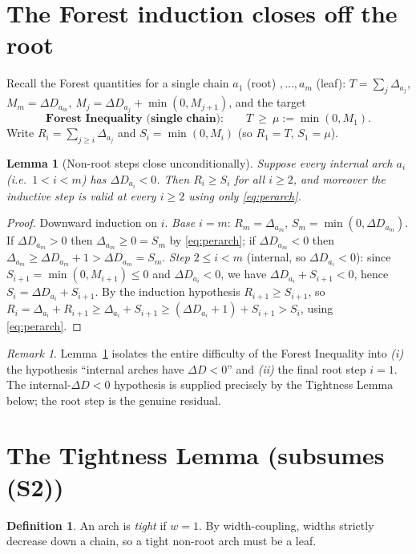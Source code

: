 \documentclass[11pt]{article}
\theoremstyle{plain}
\newtheorem{lemma}[theorem]{Lemma}
\theoremstyle{definition}
\newtheorem{definition}[theorem]{Definition}
\theoremstyle{remark}
\newtheorem{remark}[theorem]{Remark}
\newcommand{\dD}{\Delta D}
\begin{document}
\section{The Forest induction closes off the root}

Recall the Forest quantities for a single chain $a_1$ (root) $,\dots,a_m$ (leaf):
$T=\sum_j\Delta_{a_j}$, $M_m=\dD_{a_m}$, $M_j=\dD_{a_j}+\min(0,M_{j+1})$, and the target
\[
\textbf{Forest Inequality (single chain):}\qquad T\ \ge\ \mu:=\min(0,M_1).
\]
Write $R_i=\sum_{j\ge i}\Delta_{a_j}$ and $S_i=\min(0,M_i)$ (so $R_1=T$, $S_1=\mu$).

\begin{lemma}[Non-root steps close unconditionally]\label{lem:induct}
Suppose every \emph{internal} arch $a_i$ (i.e.\ $1<i<m$) has $\dD_{a_i}<0$. Then
$R_i\ge S_i$ for all $i\ge2$, and moreover the inductive step is valid at every $i\ge2$
using only \eqref{eq:perarch}.
\end{lemma}
\begin{proof}
Downward induction on $i$. \emph{Base} $i=m$: $R_m=\Delta_{a_m}$, $S_m=\min(0,\dD_{a_m})$.
If $\dD_{a_m}>0$ then $\Delta_{a_m}\ge0=S_m$ by \eqref{eq:perarch}; if $\dD_{a_m}<0$ then
$\Delta_{a_m}\ge\dD_{a_m}+1>\dD_{a_m}=S_m$. \emph{Step} $2\le i<m$ (internal, so
$\dD_{a_i}<0$): since $S_{i+1}=\min(0,M_{i+1})\le0$ and $\dD_{a_i}<0$, we have
$\dD_{a_i}+S_{i+1}<0$, hence $S_i=\dD_{a_i}+S_{i+1}$. By the induction hypothesis
$R_{i+1}\ge S_{i+1}$, so
$R_i=\Delta_{a_i}+R_{i+1}\ge\Delta_{a_i}+S_{i+1}\ge(\dD_{a_i}+1)+S_{i+1}>S_i$,
using \eqref{eq:perarch}. \end{proof}

\begin{remark}
Lemma~\ref{lem:induct} isolates the entire difficulty of the Forest Inequality into
\emph{(i)} the hypothesis ``internal arches have $\dD<0$'' and \emph{(ii)} the final root
step $i=1$. The internal-$\dD<0$ hypothesis is supplied precisely by the Tightness Lemma
below; the root step is the genuine residual.
\end{remark}

\section{The Tightness Lemma (subsumes (S2))}

\begin{definition}
An arch is \emph{tight} if $w=1$. By width-coupling, widths strictly decrease down a chain,
so a tight non-root arch must be a leaf.
\end{definition}
\end{document}
